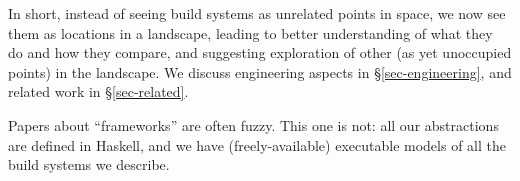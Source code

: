 In short, instead of seeing build systems as unrelated
points in space, we now see them as locations in a landscape,
leading to better understanding of what they do and how they compare,
and suggesting exploration of other (as yet unoccupied points) in the
landscape.
We discuss engineering aspects in \S\ref{sec-engineering}, and related
work in \S\ref{sec-related}.

Papers about ``frameworks'' are often fuzzy.  This one is not: all our
abstractions are defined in Haskell, and we have (freely-available)
executable models of all the build systems we describe.